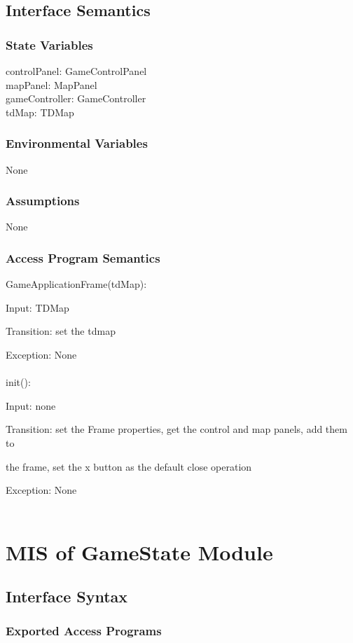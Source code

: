 \documentclass[12,english]{article}
\begin{document}
	\subsection{Interface Semantics}
		\subsubsection{State Variables}
		controlPanel: GameControlPanel\\
	    mapPanel: MapPanel\\
	    gameController: GameController\\
	    tdMap: TDMap\\
		\subsubsection{Environmental Variables}
		None
		\subsubsection{Assumptions}
        None

		\subsubsection{Access Program Semantics}
		GameApplicationFrame(tdMap):
		
		Input: TDMap
		
		Transition: set the tdmap
		
		Exception: None\\
		\\
		init():
		
		Input: none
		
		Transition: set the Frame properties, get the control and map panels, add them to
		
		the frame, set the x button as the default close operation
		
		Exception: None\\
		\\	
\section{MIS of GameState Module}
	\subsection{Interface Syntax}
	
		\subsubsection{Exported Access Programs}
		
\end{document}
